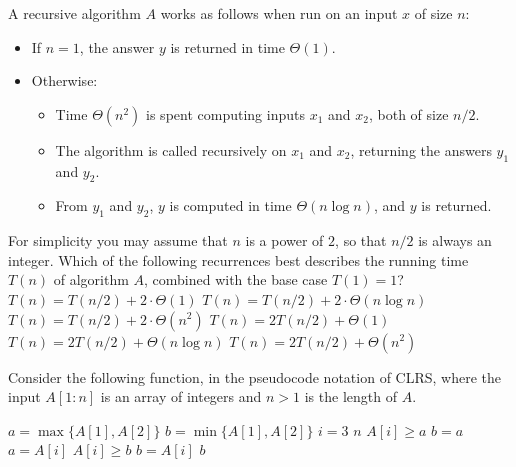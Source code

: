 


A recursive algorithm $A$ works as follows when run on an input $x$ of size $n$:
%
\begin{itemize}
  \item If $n=1$, the answer $y$ is returned in time $\Theta(1)$.
  \item Otherwise:
  \begin{itemize}
  \item Time $\Theta(n^2)$ is spent computing inputs $x_1$ and $x_2$, both of size $n/2$.
  \item The algorithm is called recursively on $x_1$ and $x_2$, returning the answers $y_1$ and $y_2$.
  \item From $y_1$ and $y_2$, $y$ is computed in time $\Theta(n \log n)$, and $y$ is returned.
\end{itemize}
\end{itemize}
%
For simplicity you may assume that $n$ is a power of $2$, so that $n/2$ is always an integer.
Which of the following recurrences best describes the running time $T(n)$ of algorithm $A$, combined with the base case $T(1)=1$?
\oneanswer
\optionsstart
\answer $T(n) = T(n/2) + 2\cdot \Theta(1)$
\answer $T(n) = T(n/2) + 2\cdot \Theta(n \log n)$
\answer $T(n) = T(n/2) + 2\cdot \Theta(n^2)$
\answer $T(n) = 2 T(n/2) + \Theta(1)$
\answer $T(n) = 2 T(n/2) + \Theta(n \log n)$
\answer $T(n) = 2 T(n/2) + \Theta(n^2)$ \correct
\optionsend
{}



Consider the following function, in the pseudocode notation of CLRS, where the input $A[1:n]$ is an array of integers and $n>1$ is the length of $A$.
\begin{codebox}
  \li $a = \max \{A[1], A[2]\}$
  \li $b = \min \{A[1], A[2]\}$
  \li \For $i = 3$ \To $n$
  \li \Do \If $A[i] \geq a$ \Do
  \li $b = a$
  \li $a = A[i]$
  \li \Else\If $A[i] \geq b$
  \li $b = A[i]$ \End\End
  \li \Return $b$
\end{codebox}

